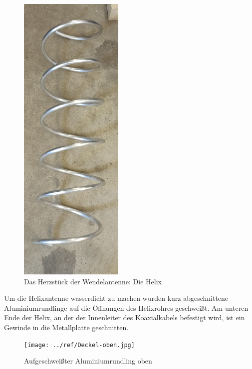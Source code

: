 \begin{figure}[h!]
	\centering
	\includegraphics[width=5cm]{../ref/Spirale.jpg}
	\caption{Das Herzstück der Wendelantenne: Die Helix}
	\label{fig:Spirale}
\end{figure}

Um die Helixantenne wasserdicht zu machen wurden kurz abgeschnittene Aluminiumrundlinge auf die Öffnungen des Helixrohres geschweißt. Am unteren Ende der Helix, an der der Innenleiter des Koaxialkabels befestigt wird, ist ein Gewinde in die Metallplatte geschnitten.

\begin{figure}[h!]
	\centering
	\texttt{[image: ../ref/Deckel-oben.jpg]}
	\caption{Aufgeschweißter Aluminiumrundling oben}
	\label{fig:Deckel-Helix-Oben}
\end{figure}


